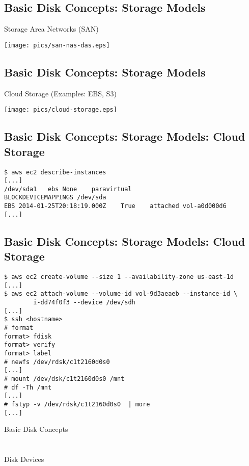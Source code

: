 \documentclass[xga]{xdvislides}
\begin{document}
\subsection{Basic Disk Concepts: Storage Models}
Storage Area Networks (SAN)
\vfill
\begin{center}
	\texttt{[image: pics/san-nas-das.eps]} \\
\end{center}
\vfill

\subsection{Basic Disk Concepts: Storage Models}
Cloud Storage (Examples: EBS, S3)
\vfill
\begin{center}
	\texttt{[image: pics/cloud-storage.eps]} \\
\end{center}
\vfill

\subsection{Basic Disk Concepts: Storage Models: Cloud Storage}
\begin{verbatim}
$ aws ec2 describe-instances
[...]
/dev/sda1	ebs	None	paravirtual
BLOCKDEVICEMAPPINGS	/dev/sda
EBS	2014-01-25T20:18:19.000Z	True	attached vol-a0d000d6
[...]
\end{verbatim}

\subsection{Basic Disk Concepts: Storage Models: Cloud Storage}
\begin{verbatim}
$ aws ec2 create-volume --size 1 --availability-zone us-east-1d
[...]
$ aws ec2 attach-volume --volume-id vol-9d3aeaeb --instance-id \
        i-dd74f0f3 --device /dev/sdh
[...]
$ ssh <hostname>
# format
format> fdisk
format> verify
format> label
# newfs /dev/rdsk/c1t2160d0s0
[...]
# mount /dev/dsk/c1t2160d0s0 /mnt
# df -Th /mnt
[...]
# fstyp -v /dev/rdsk/c1t2160d0s0  | more
[...]
\end{verbatim}



\newpage
\vspace*{\fill}
\begin{center}
	\Hugesize
		Basic Disk Concepts \\ [1em]
	\hspace*{5mm}
	\blueline\\
	\hspace*{5mm}\\
		Disk Devices
\end{center}
\vspace*{\fill}
\end{document}
